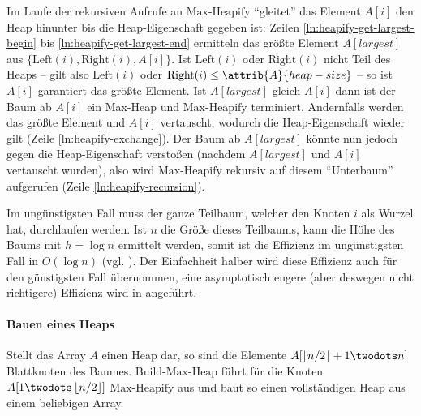 Im Laufe der rekursiven Aufrufe an $\text{Max-Heapify}$ \enquote{gleitet} das Element $A[i]$ den Heap hinunter bis die Heap-Eigenschaft gegeben ist: Zeilen \ref{ln:heapify-get-largest-begin} bis \ref{ln:heapify-get-largest-end} ermitteln das größte Element $A[largest]$ aus $\{\text{Left}(i), \text{Right}(i), A[i]\}$. Ist $\text{Left}(i)$ oder $\text{Right}(i)$ nicht Teil des Heaps -- gilt also $\text{Left}(i)$ oder $\text{Right}(i) \leq \attrib{A}{heap-size}$ -- so ist $A[i]$ garantiert das größte Element. Ist $A[largest]$ gleich $A[i]$ dann ist der Baum ab $A[i]$ ein Max-Heap und $\text{Max-Heapify}$ terminiert. Andernfalls werden das größte Element und $A[i]$ vertauscht, wodurch die Heap-Eigenschaft wieder gilt (Zeile \ref{ln:heapify-exchange}). Der Baum ab $A[largest]$ könnte nun jedoch gegen die Heap-Eigenschaft verstoßen (nachdem $A[largest]$ und $A[i]$ vertauscht wurden), also wird $\text{Max-Heapify}$ rekursiv auf diesem \enquote{Unterbaum} aufgerufen (Zeile \ref{ln:heapify-recursion}).

Im ungünstigsten Fall muss der ganze Teilbaum, welcher den Knoten $i$ als Wurzel hat, durchlaufen werden. Ist $n$ die Größe dieses Teilbaums, kann die Höhe des Baums mit $h = \log n$ ermittelt werden, somit ist die Effizienz im ungünstigsten Fall in $O(\log n)$ (vgl. \cite[155]{clrs2001}). Der Einfachheit halber wird diese Effizienz auch für den günstigsten Fall übernommen, eine asymptotisch engere (aber deswegen nicht richtigere) Effizienz wird in \cite{bff1996} angeführt.

\paragraph{Bauen eines Heaps}

Stellt das Array $A$ einen Heap dar, so sind die Elemente $A[\floor{n / 2} + 1 \twodots n]$ Blattknoten des Baumes\footnotemark. $\text{Build-Max-Heap}$ führt für die Knoten $A[1 \twodots \floor{n / 2}]$ $\text{Max-Heapify}$ aus und baut so einen vollständigen Heap aus einem beliebigen Array.


